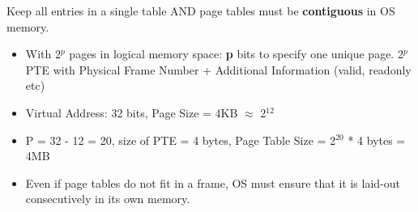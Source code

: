 \documentclass[10pt,landscape]{article}
\begin{document}
\begin{multicols*}{3}
Keep all entries in a single table AND page tables must be \textbf{contiguous} in OS memory.
\begin{itemize}[topsep=0pt,noitemsep,wide=0pt, leftmargin=\dimexpr{} + 2\relax]
    \item With 2$^p$ pages in logical memory space: \textbf{p} bits to specify one unique page. 2$^p$ PTE with Physical Frame Number + Additional Information (valid, readonly etc)
    \item Virtual Address: 32 bits, Page Size = 4KB $\approx$ 2$^{12}$
    \item P = 32 - 12 = 20, size of PTE = 4 bytes, Page Table Size = 2$^{20}$ * 4 bytes = 4MB
    \item Even if page tables do not fit in a frame, OS must ensure that it is laid-out consecutively in its own memory.
\end{itemize}


\end{multicols*}
\end{document}
